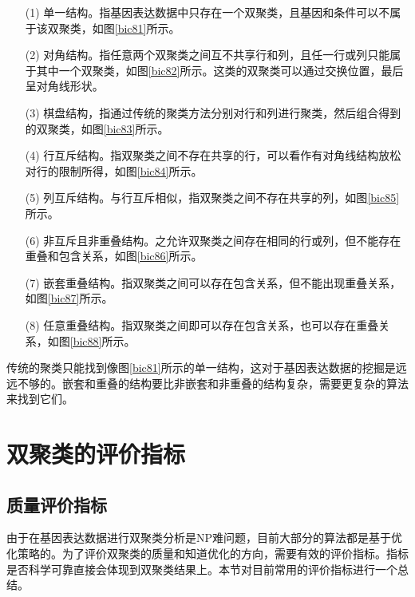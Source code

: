   \begin{enumerate}
    \item[(1)] 单一结构。指基因表达数据中只存在一个双聚类，且基因和条件可以不属于该双聚类，如图\ref{bic81}所示。
    \item[(2)] 对角结构。指任意两个双聚类之间互不共享行和列，且任一行或列只能属于其中一个双聚类，如图\ref{bic82}所示。这类的双聚类可以通过交换位置，最后呈对角线形状。
    \item[(3)] 棋盘结构，指通过传统的聚类方法分别对行和列进行聚类，然后组合得到的双聚类，如图\ref{bic83}所示。
    \item[(4)] 行互斥结构。指双聚类之间不存在共享的行，可以看作有对角线结构放松对行的限制所得，如图\ref{bic84}所示。
    \item[(5)] 列互斥结构。与行互斥相似，指双聚类之间不存在共享的列，如图\ref{bic85}所示。
    \item[(6)] 非互斥且非重叠结构。之允许双聚类之间存在相同的行或列，但不能存在重叠和包含关系，如图\ref{bic86}所示。
    \item[(7)] 嵌套重叠结构。指双聚类之间可以存在包含关系，但不能出现重叠关系，如图\ref{bic87}所示。
    \item[(8)] 任意重叠结构。指双聚类之间即可以存在包含关系，也可以存在重叠关系，如图\ref{bic88}所示。
  \end{enumerate}

  传统的聚类只能找到像图\ref{bic81}所示的单一结构，这对于基因表达数据的挖掘是远远不够的。嵌套和重叠的结构要比非嵌套和非重叠的结构复杂，需要更复杂的算法来找到它们。

  
\section{双聚类的评价指标}
  \subsection{质量评价指标}\label{section:qualityEval}
  由于在基因表达数据进行双聚类分析是NP难问题，目前大部分的算法都是基于优化策略的。为了评价双聚类的质量和知道优化的方向，需要有效的评价指标。指标是否科学可靠直接会体现到双聚类结果上。本节对目前常用的评价指标进行一个总结。
  
